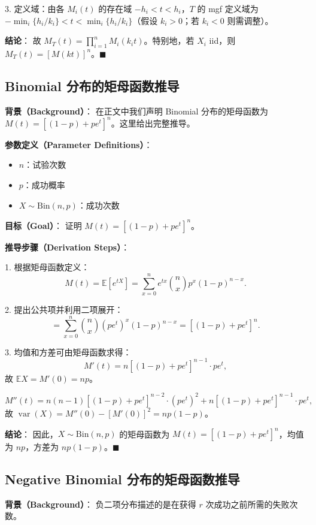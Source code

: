 3. 定义域：由各 $M_i(t)$ 的存在域 $-h_i < t < h_i$，$T$ 的 mgf 定义域为 $-\min_i\{h_i/k_i\} < t < \min_i\{h_i/k_i\}$（假设 $k_i > 0$；若 $k_i < 0$ 则需调整）。

\textbf{结论}：
故 $M_T(t) = \prod_{i=1}^n M_i(k_i t)$。特别地，若 $X_i$ iid，则 $M_T(t) = [M(k t)]^n$。$\blacksquare$

\subsection{Binomial 分布的矩母函数推导}\label{sec:binomial-mgf-derivation}

\textbf{背景（Background）}：
在正文中我们声明 Binomial 分布的矩母函数为 $M(t) = [(1-p) + pe^t]^n$。这里给出完整推导。

\textbf{参数定义（Parameter Definitions）}：
\begin{itemize}
\item $n$：试验次数
\item $p$：成功概率
\item $X \sim \text{Bin}(n, p)$：成功次数
\end{itemize}

\textbf{目标（Goal）}：
证明 $M(t) = [(1-p) + pe^t]^n$。

\textbf{推导步骤（Derivation Steps）}：

1. 根据矩母函数定义：
\[
M(t) = \mathbb{E}[e^{tX}] = \sum_{x=0}^n e^{tx} \binom{n}{x} p^x (1-p)^{n-x}.
\]

2. 提出公共项并利用二项展开：
\[
= \sum_{x=0}^n \binom{n}{x} (pe^t)^x (1-p)^{n-x} = [(1-p) + pe^t]^n.
\]

3. 均值和方差可由矩母函数求得：
\[
M'(t) = n[(1-p) + pe^t]^{n-1} \cdot pe^t,
\]
故 $\mathbb{E}X = M'(0) = np$。

\[
M''(t) = n(n-1)[(1-p) + pe^t]^{n-2} \cdot (pe^t)^2 + n[(1-p) + pe^t]^{n-1} \cdot pe^t,
\]
故 $\operatorname{var}(X) = M''(0) - [M'(0)]^2 = np(1-p)$。

\textbf{结论}：
因此，$X \sim \text{Bin}(n, p)$ 的矩母函数为 $M(t) = [(1-p) + pe^t]^n$，均值为 $np$，方差为 $np(1-p)$。$\blacksquare$

\subsection{Negative Binomial 分布的矩母函数推导}\label{sec:negative-binomial-mgf}

\textbf{背景（Background）}：
负二项分布描述的是在获得 $r$ 次成功之前所需的失败次数。

